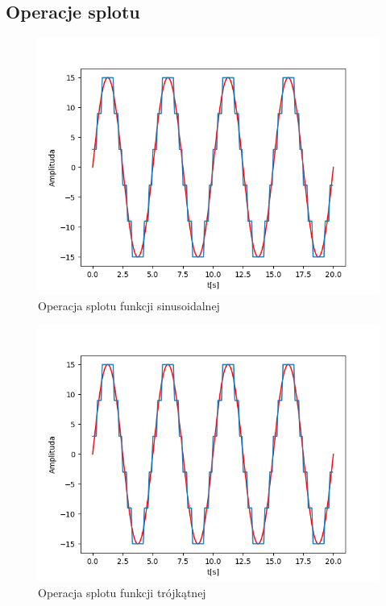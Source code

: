 \documentclass[12pt]{article}
\begin{document}
\subsection{Operacje splotu}
\begin{figure}[H]
\centering
\includegraphics[scale=0.6]{1sinusKwantStopien5.png}
\caption{Operacja splotu funkcji sinusoidalnej}
\end{figure}

\begin{figure}[H]
\centering
\includegraphics[scale=0.6]{1sinusKwantStopien5.png}
\caption{Operacja splotu funkcji trójkątnej}
\end{figure}
\end{document}
